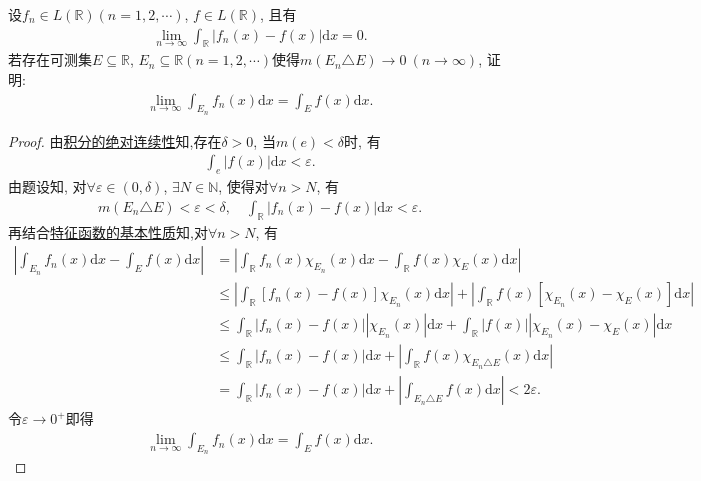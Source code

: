 \documentclass[../../main.tex]{subfiles}%
\begin{document}
\begin{example}
设$f_n \in L(\mathbb{R})(n = 1,2,\cdots)$, $f \in L(\mathbb{R})$, 且有
\begin{align*}
\lim\limits_{n \to \infty} \int_{\mathbb{R}} |f_n(x) - f(x)| \mathrm{d}x = 0.
\end{align*}
若存在可测集$E \subseteq \mathbb{R}$, $E_n \subseteq \mathbb{R}(n = 1,2,\cdots)$使得$m(E_n \triangle E) \to 0\ (n \to \infty)$, 证明:
\begin{align*}
\lim\limits_{n \to \infty} \int_{E_n} f_n(x) \mathrm{d}x = \int_E f(x) \mathrm{d}x.
\end{align*}
\end{example}
\begin{proof}
由\hyperref[theorem:积分的绝对连续性]{积分的绝对连续性}知,存在$\delta > 0$, 当$m(e) < \delta$时, 有
\begin{align*}
\int_e |f(x)| \mathrm{d}x < \varepsilon.
\end{align*}
由题设知, 对$\forall \varepsilon \in (0,\delta)$, $\exists N \in \mathbb{N}$, 使得对$\forall n > N$, 有
\begin{align*}
m(E_n \triangle E) < \varepsilon < \delta, \quad \int_{\mathbb{R}} |f_n(x) - f(x)| \mathrm{d}x < \varepsilon.
\end{align*}
再结合\hyperref[Set Theory-proposition:特征函数的基本性质-6]{特征函数的基本性质}知,对$\forall n > N$, 有
\begin{align*}
\left| \int_{E_n} f_n(x) \mathrm{d}x - \int_E f(x) \mathrm{d}x \right|
&= \left| \int_{\mathbb{R}} f_n(x) \chi_{E_n}(x) \mathrm{d}x - \int_{\mathbb{R}} f(x) \chi_E(x) \mathrm{d}x \right| \\
&\leqslant \left| \int_{\mathbb{R}} \left[ f_n(x) - f(x) \right] \chi_{E_n}(x) \mathrm{d}x \right| + \left| \int_{\mathbb{R}} f(x) \left[ \chi_{E_n}(x) - \chi_E(x) \right] \mathrm{d}x \right| \\
&\leqslant \int_{\mathbb{R}} |f_n(x) - f(x)| |\chi_{E_n}(x)| \mathrm{d}x + \int_{\mathbb{R}} |f(x)| |\chi_{E_n}(x) - \chi_E(x)| \mathrm{d}x \\
&\leqslant \int_{\mathbb{R}} |f_n(x) - f(x)| \mathrm{d}x + \left| \int_{\mathbb{R}} f(x) \chi_{E_n \triangle E}(x) \mathrm{d}x \right| \\
&= \int_{\mathbb{R}} |f_n(x) - f(x)| \mathrm{d}x + \left| \int_{E_n \triangle E} f(x) \mathrm{d}x \right|
< 2\varepsilon.
\end{align*}
令$\varepsilon \to 0^+$即得
\begin{align*}
\lim\limits_{n \to \infty} \int_{E_n} f_n(x) \mathrm{d}x = \int_E f(x) \mathrm{d}x.
\end{align*}
\end{proof}
\end{document}
